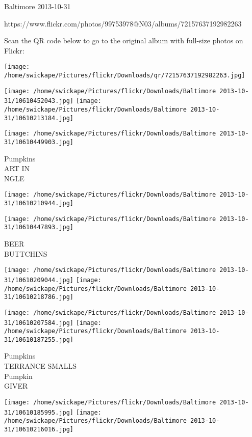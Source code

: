 \documentclass[10pt,letterpaper]{article}
\begin{document}
Baltimore 2013-10-31

https://www.flickr.com/photos/99753978@N03/albums/72157637192982263

Scan the QR code below to go to the original album with full-size photos on Flickr:

\texttt{[image: /home/swickape/Pictures/flickr/Downloads/qr/72157637192982263.jpg]}
\pagebreak

\texttt{[image: /home/swickape/Pictures/flickr/Downloads/Baltimore 2013-10-31/10610452043.jpg]}
\texttt{[image: /home/swickape/Pictures/flickr/Downloads/Baltimore 2013-10-31/10610213184.jpg]}

\texttt{[image: /home/swickape/Pictures/flickr/Downloads/Baltimore 2013-10-31/10610449903.jpg]}

Pumpkins\\
ART IN\\
NGLE\\
\pagebreak

\texttt{[image: /home/swickape/Pictures/flickr/Downloads/Baltimore 2013-10-31/10610210944.jpg]}

\vspace{0.25in}
\texttt{[image: /home/swickape/Pictures/flickr/Downloads/Baltimore 2013-10-31/10610447893.jpg]}

BEER\\
BUTTCHINS\\
\pagebreak

\texttt{[image: /home/swickape/Pictures/flickr/Downloads/Baltimore 2013-10-31/10610209044.jpg]}
\texttt{[image: /home/swickape/Pictures/flickr/Downloads/Baltimore 2013-10-31/10610218786.jpg]}

\texttt{[image: /home/swickape/Pictures/flickr/Downloads/Baltimore 2013-10-31/10610207584.jpg]}
\texttt{[image: /home/swickape/Pictures/flickr/Downloads/Baltimore 2013-10-31/10610187255.jpg]}

Pumpkins\\
TERRANCE SMALLS\\
Pumpkin\\
GIVER\\
\pagebreak

\texttt{[image: /home/swickape/Pictures/flickr/Downloads/Baltimore 2013-10-31/10610185995.jpg]}
\texttt{[image: /home/swickape/Pictures/flickr/Downloads/Baltimore 2013-10-31/10610216016.jpg]}
\end{document}
